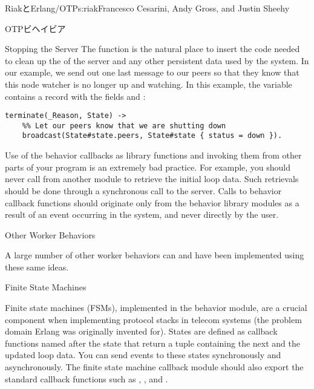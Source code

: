\begin{aosachapter}{RiakとErlang/OTP}{s:riak}{Francesco Cesarini, Andy Gross, and Justin Sheehy}
\begin{aosasect1}{OTPビヘイビア}
\begin{aosasect2}{Stopping the Server}
The  function is the natural place to insert the code
needed to clean up the  of the server and any other
persistent data used by the system. In our example, we send out one
last message to our peers so that they know that this node watcher is
no longer up and watching. In this example, the variable 
contains a record with the fields  and :

\begin{verbatim}
terminate(_Reason, State) ->
    %% Let our peers know that we are shutting down
    broadcast(State#state.peers, State#state { status = down }).
\end{verbatim}

Use of the behavior callbacks as library functions and invoking them
from other parts of your program is an extremely bad practice. For
example, you should never call
 from another module to
retrieve the initial loop data. Such retrievals should be done through
a synchronous call to the server. Calls to behavior callback functions
should originate only from the behavior library modules as a result of
an event occurring in the system, and never directly by the user.

\end{aosasect2}

\end{aosasect1}

\begin{aosasect1}{Other Worker Behaviors}

A large number of other worker behaviors can and have been implemented
using these same ideas.

\begin{aosasect2}{Finite State Machines}

Finite state machines (FSMs), implemented in the  behavior
module, are a crucial component when implementing protocol stacks in
telecom systems (the problem domain Erlang was originally invented
for). States are defined as callback functions named after the state
that return a tuple containing the next  and the updated
loop data. You can send events to these states synchronously and
asynchronously. The finite state machine callback module should also
export the standard callback functions such as ,
, and .


\end{aosasect2}
\end{aosasect1}
\end{aosachapter}
